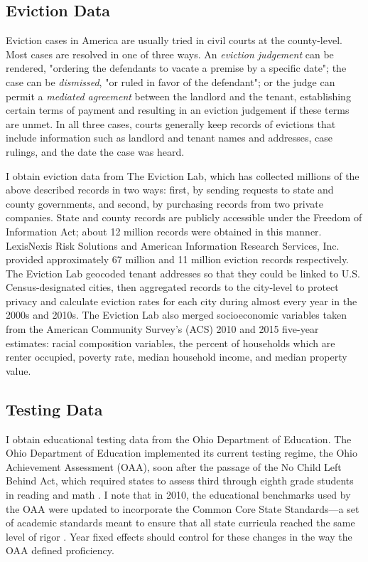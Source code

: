 \documentclass[12pt]{article}
\begin{document}
\subsection{Eviction Data}
Eviction cases in America are usually tried in civil courts at the county-level. Most cases are resolved in one of three ways. An \textit{eviction judgement} can be rendered, "ordering the defendants to vacate a premise by a specific date"; the case can be \textit{dismissed}, "or ruled in favor of the defendant"; or the judge can permit a \textit{mediated agreement} between the landlord and the tenant, establishing certain terms of payment and resulting in an eviction judgement if these terms are unmet\citep{desmond_eviction_2018}. In all three cases, courts generally keep records of evictions that include information such as landlord and tenant names and addresses, case rulings, and the date the case was heard.

I obtain eviction data from The Eviction Lab, which has collected millions of the above described records in two ways: first, by sending requests to state and county governments, and second, by purchasing records from two private companies. State and county records are publicly accessible under the Freedom of Information Act; about 12 million records were obtained in this manner. LexisNexis Risk Solutions and American Information Research Services, Inc. provided approximately 67 million and 11 million eviction records respectively. The Eviction Lab geocoded tenant addresses so that they could be linked to U.S. Census-designated cities, then aggregated records to the city-level to protect privacy and calculate eviction rates for each city during almost every year in the 2000s and 2010s. The Eviction Lab also merged socioeconomic variables taken from the American Community Survey's (ACS) 2010 and 2015 five-year estimates: racial composition variables, the percent of households which are renter occupied, poverty rate, median household income, and median property value.

\subsection{Testing Data}
I obtain educational testing data from the Ohio Department of Education. The Ohio Department of Education implemented its current testing regime, the Ohio Achievement Assessment (OAA), soon after the passage of the No Child Left Behind Act, which required states to assess third through eighth grade students in reading and math \citep{fox_examination_2014}. I note that in  2010, the educational benchmarks used by the OAA were updated to incorporate the Common Core State Standards—a set of academic standards meant to ensure that all state curricula reached the same level of rigor \citep{ohio_school_boards_association_ohios_2010}. Year fixed effects should control for these changes in the way the OAA defined proficiency.
\end{document}
